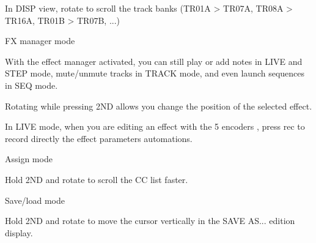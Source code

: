 In DISP view, rotate  to scroll the track banks (TR01A > TR07A, TR08A > TR16A, TR01B > TR07B, ...)

FX manager mode

With the effect manager activated, you can still play or add notes in LIVE and STEP mode, mute/unmute tracks in TRACK mode, and even launch sequences in SEQ mode.

Rotating  while pressing  2ND  allows you change the position of the selected effect.

In LIVE mode, when you are editing an effect with the 5 encoders , press rec   to record directly the effect parameters automations.

Assign mode

Hold  2ND  and rotate  to scroll the CC list faster.

Save/load mode

Hold  2ND  and rotate  to move the cursor vertically in the SAVE AS... edition display.